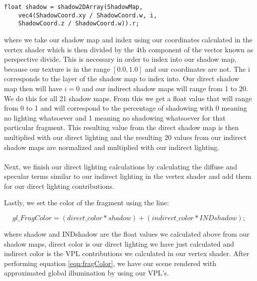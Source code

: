 \begin{lstlisting}
float shadow = shadow2DArray(ShadowMap, 
	vec4(ShadowCoord.xy / ShadowCoord.w, i, 
	ShadowCoord.z / ShadowCoord.w)).r;
\end{lstlisting}

where we take our shadow map and index using our coordinates calculated in the vertex shader which is then divided by the 4th component of the vector known as perspective divide.  This is necessary in order to index into our shadow map, because our texture is in the range $[0.0, 1.0]$ and our coordinates are not.  The i corresponds to the layer of the shadow map to index into.  Our direct shadow map then will have $i=0$ and our indirect shadow maps will range from 1 to 20.  We do this for all 21 shadow maps.  From this we get a float value that will range from 0 to 1 and will correspond to the percentage of shadowing with 0 meaning no lighting whatsoever and 1 meaning no shadowing whatsoever for that particular fragment.  This resulting value from the direct shadow map is then multiplied with our direct lighting and the resulting 20 values from our indirect shadow maps are normalized and multiplied with our indirect lighting.

\paragraph{}
Next, we finish our direct lighting calculations by calculating the diffuse and specular terms similar to our indirect lighting in the vertex shader and add them for our direct lighting contributions.

Lastly, we set the color of the fragment using the line:

\begin{equation}
gl\_FragColor = (direct\_color*shadow) + (indirect\_color*INDshadow); \label{eqn:fragColor}
\end{equation}

where shadow and INDshadow are the float values we calculated above from our shadow maps, direct color is our direct lighting we have just calculated and indirect color is the VPL contributions we calculated in our vertex shader.  After performing equation \ref{eqn:fragColor}, we have our scene rendered with approximated global illumination by using our VPL's.

